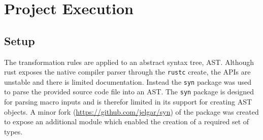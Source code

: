 \documentclass[ oneside,%
                    author={James Elgar},
                    degree={MEng},
                     title={Bidirectional transformer between functional and \\ object-oriented programming in Rust},
                  subtitle={}]{dissertation}
\begin{document}






\chapter{Project Execution}
\label{chap:execution}

\section{Setup}

The transformation rules are applied to an abstract syntax tree, AST. 
Although rust exposes the native compiler parser through the \verb|rustc| create, the APIs are unstable and there is limited documentation. Instead the \verb|syn| package was used to parse the provided source code file into an AST. 
The \verb|syn| package is designed for parsing macro inputs and is therefor limited in its support for creating AST objects. A minor fork (\url{https://github.com/jelgar/syn}) of the package was created to expose an additional module which enabled the creation of a required set of types.
\end{document}
